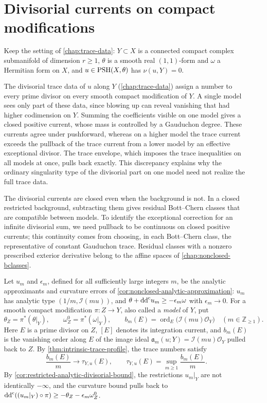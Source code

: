 \chapter{Divisorial currents on compact modifications}
\label{chap:divisorial-models}

Keep the setting of \cref{chap:trace-data}: $Y\subset X$ is a connected compact complex submanifold of dimension $r\geq1$, $\theta$ is a smooth real $(1,1)$-form and $\omega$ a Hermitian form on $X$, and $u\in\mathrm{PSH}(X,\theta)$ has $\nu(u,Y)=0$.

The divisorial trace data of $u$ along $Y$ (\cref{chap:trace-data}) assign a number to every prime divisor on every smooth compact modification of $Y$. A single model sees only part of these data, since blowing up can reveal vanishing that had higher codimension on $Y$. Summing the coefficients visible on one model gives a closed positive current, whose mass is controlled by a Gauduchon degree. These currents agree under pushforward, whereas on a higher model the trace current exceeds the pullback of the trace current from a lower model by an effective exceptional divisor. The trace envelope, which imposes the trace inequalities on all models at once, pulls back exactly. This discrepancy explains why the ordinary singularity type of the divisorial part on one model need not realize the full trace data.

The divisorial currents are closed even when the background is not. In a closed restricted background, subtracting them gives residual Bott--Chern classes that are compatible between models. To identify the exceptional correction for an infinite divisorial sum, we need pullback to be continuous on closed positive currents; this continuity comes from choosing, in each Bott--Chern class, the representative of constant Gauduchon trace. Residual classes with a nonzero prescribed exterior derivative belong to the affine spaces of \cref{chap:nonclosed-bclasses}.

Let $u_m$ and $\epsilon_m$, defined for all sufficiently large integers $m$, be the analytic approximants and curvature errors of \cref{cor:nonclosed-analytic-approximation}: $u_m$ has analytic type $(1/m,\mathcal I(mu))$, and $\theta+\mathrm{dd}^{\mathrm{c}} u_m\geq-\epsilon_m\omega$ with $\epsilon_m\to0$. For a smooth compact modification $\pi\colon Z\to Y$, also called a \emph{model} of $Y$, put
\[
 \theta_Z=\pi^*(\theta|_Y),\qquad
 \omega_Z^0=\pi^*(\omega|_Y),\qquad
 b_m(E)=\operatorname{ord}_E\bigl(\mathcal I(mu)\mathcal O_Y\bigr)
 \quad(m\in\mathbb Z_{\geq1}).
\]
Here $E$ is a prime divisor on $Z$, $[E]$ denotes its integration current, and $b_m(E)$ is the vanishing order along $E$ of the image ideal $\mathfrak a_m(u;Y)=\mathcal I(mu)\mathcal O_Y$ pulled back to $Z$. By \cref{thm:intrinsic-trace-profile}, the trace numbers satisfy
\[
 \frac{b_m(E)}m\longrightarrow\tau_{Y,u}(E),\qquad
 \tau_{Y,u}(E)=\sup_{m\geq1}\frac{b_m(E)}m.
\]
By \cref{cor:restricted-analytic-divisorial-bound}, the restrictions $u_m|_Y$ are not identically $-\infty$, and the curvature bound pulls back to $\mathrm{dd}^{\mathrm{c}}((u_m|_Y)\circ\pi)\geq-\theta_Z-\epsilon_m\omega_Z^0$.

